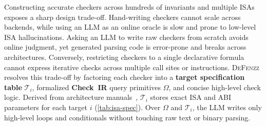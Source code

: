 \documentclass[conference,compsoc]{IEEEtran}
\begin{document}
Constructing accurate checkers across hundreds of invariants and multiple ISAs exposes a sharp design trade-off. Hand-writing checkers cannot scale across backends, while using an LLM as an online oracle is slow and prone to low-level ISA hallucinations. Asking an LLM to write raw checkers from scratch avoids online judgment, yet generated parsing code is error-prone and breaks across architectures. Conversely, restricting checkers to a single declarative formula cannot express iterative checks across multiple call sites or instructions. \textsc{DeFenzz} resolves this trade-off by factoring each checker into a \textbf{target specification table} $\mathcal{T}_i$, formalized \textbf{Check~IR} query primitives $\Omega$, and concise high-level check logic. Derived from architecture manuals~\cite{x86psabi,arm_aapcs64,riscvpsabi,loongarchabi}, $\mathcal{T}_i$ stores exact ISA and ABI parameters for each target $i$ (\autoref{tab:isa-spec}). Over $\Omega$ and $\mathcal{T}_i$, the LLM writes only high-level loops and conditionals without touching raw text or binary parsing.

\begin{table}[b]
\centering
\caption{Selected ISA and ABI parameters for representative targets in $\mathcal{T}_i$.}
\label{tab:isa-spec}
\footnotesize
\setlength{\tabcolsep}{2.8pt}
\renewcommand{\arraystretch}{1.12}
\end{table}
\end{document}
